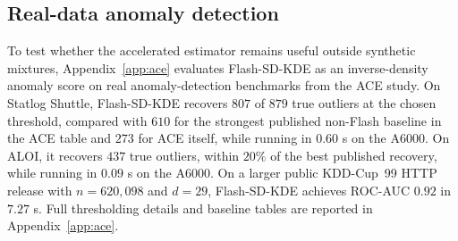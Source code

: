 \subsection{Real-data anomaly detection}

To test whether the accelerated estimator remains useful outside synthetic
mixtures, Appendix~\ref{app:ace} evaluates Flash-SD-KDE as an inverse-density
anomaly score on real anomaly-detection benchmarks from the ACE study.  On
Statlog Shuttle, Flash-SD-KDE recovers $807$ of $879$ true outliers at the
chosen threshold, compared with $610$ for the strongest published non-Flash
baseline in the ACE table and $273$ for ACE itself, while running in $0.60$ s
on the A6000.  On ALOI, it recovers $437$ true outliers, within $20\%$ of the
best published recovery, while running in $0.09$ s on the A6000.  On a larger
public KDD-Cup~99 HTTP release with $n=620{,}098$ and $d=29$, Flash-SD-KDE
achieves ROC-AUC $0.92$ in $7.27$ s.  Full thresholding details and baseline
tables are reported in Appendix~\ref{app:ace}.